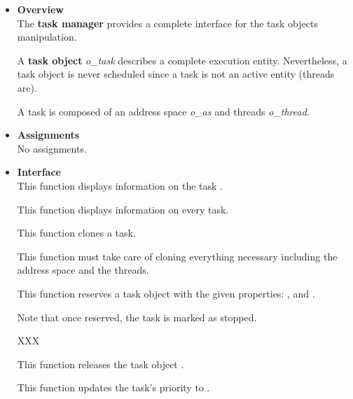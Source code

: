 \begin{itemize}
  \item {\bf Overview}\\

    The \textbf{task manager} provides a complete interface for the
    task objects manipulation.

    A \textbf{task object} \textit{o\_task} describes a complete
    execution entity. Nevertheless, a task object is never scheduled
    since a task is not an active entity (threads are).

    A task is composed of an address space \textit{o\_as} and threads
    \textit{o\_thread}.

  \item {\bf Assignments}\\

    No assignments.

  \item {\bf Interface}\\

	 {
	   This function displays information on the task .
	 }

	 {
	   This function displays information on every task.
	 }

	 {
	   This function clones a task.

	   This function must take care of cloning everything necessary
	   including the address space and the threads.
	 }

	 {
	   This function reserves a task object with the given
	   properties: ,  and
	   .

	   Note that once reserved, the task is marked as stopped.

	   XXX
	 }

	 {
	   This function releases the task object .
	 }

	 {
	   This function updates the task's priority to .
	 }


\end{itemize}
